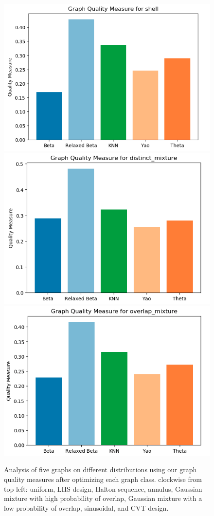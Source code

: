 \begin{figure}[htbp]
    \includegraphics[width=0.45\linewidth]{figs/chap7/shell_quality.png}
    \includegraphics[width=0.45\linewidth]{figs/chap7/distinct_quality.png}
    \includegraphics[width=0.45\linewidth]{figs/chap7/overlap_quality.png}
    \caption[Two-dimensional optimal graph quality results]{Analysis of five graphs on different distributions using our graph quality measures after optimizing each graph class.
    clockwise from top left: uniform, LHS design, Halton sequence, annulus, Gaussian mixture with high probability of overlap, Gaussian mixture with a low probability of overlap, sinusoidal, and CVT design.}
    \label{fig:graph_quality}
\end{figure}

